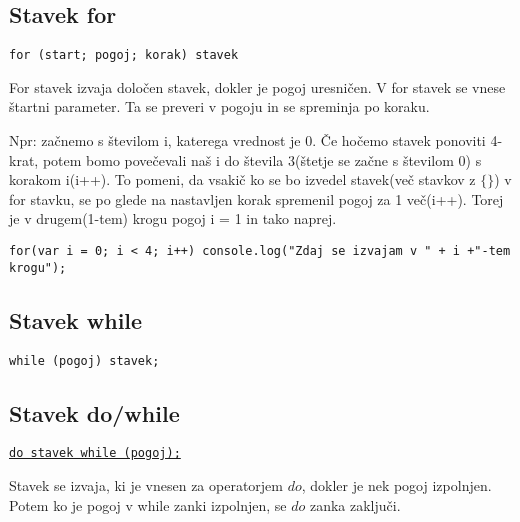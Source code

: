 \subsection{Stavek for}

\texttt{for (start; pogoj; korak) stavek}

For stavek izvaja določen stavek, dokler je pogoj uresničen. V for stavek se vnese štartni parameter. Ta se preveri v pogoju in se spreminja po koraku.


Npr: začnemo s številom i, katerega vrednost je 0. Če hočemo stavek ponoviti 4-krat, potem bomo povečevali naš i do števila 3(štetje se začne s številom 0) s korakom i(i++). To pomeni, da vsakič ko se bo izvedel stavek(več stavkov z $\{\}$) v for stavku, se po glede na nastavljen korak spremenil pogoj za 1 več(i++). Torej je v drugem(1-tem) krogu pogoj i = 1 in tako naprej.

\begin{verbatim}
for(var i = 0; i < 4; i++) console.log("Zdaj se izvajam v " + i +"-tem krogu");
\end{verbatim}

\subsection{Stavek while}

\texttt{while (pogoj) stavek;}
\newpage

\subsection{Stavek do/while}

\underline{\texttt{do stavek while (pogoj);}}

Stavek se izvaja, ki je vnesen za operatorjem $do$, dokler je nek pogoj izpolnjen. Potem ko je pogoj v while zanki izpolnjen, se $do$ zanka zaključi.

